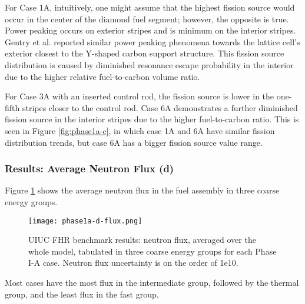 For Case 1A, intuitively, one might assume that the highest fission source would 
occur in the center of the diamond fuel segment; however, the opposite is true. 
Power peaking occurs on exterior stripes and is minimum on the interior stripes.
Gentry et al. \cite{gentry_development_2016} reported similar power peaking 
phenomena towards the lattice cell's exterior closest to the Y-shaped carbon 
support structure.  
This fission source distribution is caused by diminished resonance escape 
probability in the interior due to the higher relative fuel-to-carbon volume 
ratio. 

For Case 3A with an inserted control rod, the fission source is lower in 
the one-fifth stripes closer to the control rod.  
Case 6A demonstrates a further diminished fission source in the interior 
stripes due to the higher fuel-to-carbon ratio.
This is seen in Figure \ref{fig:phase1a-c}, in which case 1A and 6A have similar 
fission distribution trends, but case 6A has a bigger fission source value range. 

\subsubsection{Results: Average Neutron Flux (d)}
Figure \ref{fig:phase1a-d} shows the average neutron flux in the fuel assembly in 
three coarse energy groups. 
\begin{figure}[htbp]
    \centering
    \texttt{[image: phase1a-d-flux.png]} 
    \caption{\gls{UIUC} \gls{FHR} benchmark results: neutron flux, 
    averaged over the whole model, tabulated in three coarse energy groups for 
    each Phase I-A case. Neutron flux uncertainty is on the order of 1e10.}
    \label{fig:phase1a-d}
\end{figure}
Most cases have the most flux in the intermediate group, followed by 
the thermal group, and the least flux in the fast group.   

